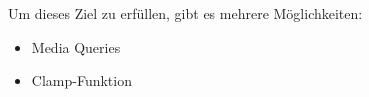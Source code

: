 

Um dieses Ziel zu erfüllen, gibt es mehrere Möglichkeiten:

\begin{itemize}
    \item Media Queries
    \item Clamp-Funktion
\end{itemize}


